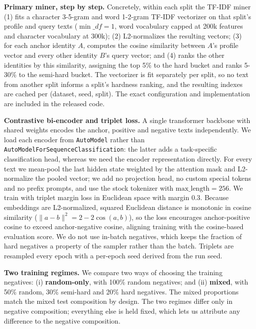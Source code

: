 \documentclass[11pt]{article}
\begin{document}
\noindent\textbf{Primary miner, step by step.} Concretely, within each split the TF-IDF miner (1) fits a character 3-5-gram and word 1-2-gram TF-IDF vectorizer on that split's profile and query texts ($\min\_df{=}1$, word vocabulary capped at 200k features and character vocabulary at 300k); (2) L2-normalizes the resulting vectors; (3) for each anchor identity $A$, computes the cosine similarity between $A$'s profile vector and every other identity $B$'s query vector; and (4) ranks the other identities by this similarity, assigning the top 5\% to the hard bucket and ranks 5-30\% to the semi-hard bucket. The vectorizer is fit separately per split, so no text from another split informs a split's hardness ranking, and the resulting indexes are cached per (dataset, seed, split). The exact configuration and implementation are included in the released code.

\noindent\textbf{Contrastive bi-encoder and triplet loss.} A single transformer backbone with shared weights encodes the anchor, positive and negative texts independently. We load each encoder from \texttt{AutoModel} rather than \texttt{AutoModelForSequenceClassification}: the latter adds a task-specific classification head, whereas we need the encoder representation directly. For every text we mean-pool the last hidden state weighted by the attention mask and L2-normalize the pooled vector; we add no projection head, no custom special tokens and no prefix prompts, and use the stock tokenizer with $\text{max\_length}=256$. We train with triplet margin loss in Euclidean space with margin $0.3$. Because embeddings are L2-normalized, squared Euclidean distance is monotonic in cosine similarity ($\|a-b\|^2 = 2 - 2\cos(a,b)$), so the loss encourages anchor-positive cosine to exceed anchor-negative cosine, aligning training with the cosine-based evaluation score. We do not use in-batch negatives, which keeps the fraction of hard negatives a property of the sampler rather than the batch. Triplets are resampled every epoch with a per-epoch seed derived from the run seed.

\noindent\textbf{Two training regimes.} We compare two ways of choosing the training negatives: (i) \textbf{random-only}, with 100\% random negatives; and (ii) \textbf{mixed}, with 50\% random, 30\% semi-hard and 20\% hard negatives. The mixed proportions match the mixed test composition by design. The two regimes differ only in negative composition; everything else is held fixed, which lets us attribute any difference to the negative composition.
\end{document}
